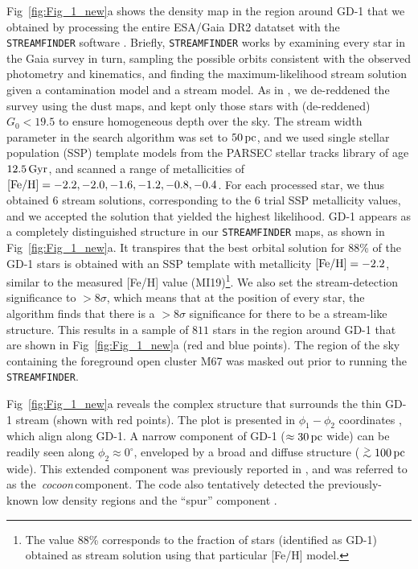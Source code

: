 \documentclass[apj]{emulateapj}
\def\gtsima{$\; \buildrel > \over \sim \;$}
\def\simgt{\lower.5ex\hbox{\gtsima}}
\def\pc{{\rm\,pc}}
\def\deg{^\circ}
\def\Gyr{{\rm\,Gyr}}
\def\gtsima{$\; \buildrel > \over \sim \;$}
\def\cocoon{{\it\,cocoon\,}}
\begin{document}
Fig~\ref{fig:Fig_1_new}a shows the density map in the region around GD-1 that we obtained by processing the entire ESA/Gaia DR2 datatset \citep{GaiaDR2_2018_Brown, GaiaDR2_2018_astrometry} with the \texttt{STREAMFINDER} software \citep{Malhan2018_SF, Malhan_Ghostly_2018, Ibata_Norse_streams2019}. Briefly, \texttt{STREAMFINDER} works by examining every star in the Gaia survey in turn, sampling the possible orbits consistent with the observed photometry and kinematics, and finding the maximum-likelihood stream solution given a contamination model and a stream model. As in \cite{Malhan_Ghostly_2018}, we de-reddened the survey using the \cite{Schlegel1998} dust maps, and kept only those stars with (de-reddened) $G_0<19.5$ to ensure homogeneous depth over the sky. The stream width parameter in the search algorithm was set to $50\pc$, and we used single stellar population (SSP) template models from the PARSEC stellar tracks library \citep{Parsec_isochrones2012} of age $12.5\Gyr$, and scanned a range of metallicities of ${\rm [Fe/H]}=-2.2, -2.0, -1.6, -1.2, -0.8, -0.4$. For each processed star, we thus obtained 6 stream solutions, corresponding to the 6 trial SSP metallicity values, and we accepted the solution that yielded the highest likelihood. GD-1 appears as a completely distinguished structure in our \texttt{STREAMFINDER} maps, as shown in Fig~\ref{fig:Fig_1_new}a. It transpires that the best orbital solution for 88\% of the GD-1 stars is obtained with an SSP template with metallicity ${\rm [Fe/H]}=-2.2$, similar to the measured [Fe/H] value (MI19)\footnote{The value 88\% corresponds to the fraction of stars (identified as GD-1) obtained as stream solution using that particular [Fe/H] model.}. We also set the stream-detection significance to $>8\sigma$, which means that at the position of every star, the algorithm finds that there is a $>8\sigma$ significance for there to be a stream-like structure. This results in a sample of $811$ stars in the region around GD-1 that are shown in Fig~\ref{fig:Fig_1_new}a (red and blue points). The region of the sky containing the foreground open cluster M67 was masked out prior to running the \texttt{STREAMFINDER}.

Fig~\ref{fig:Fig_1_new}a reveals the complex structure that surrounds the thin GD-1 stream (shown with red points). The plot is presented in $\phi_1 - \phi_2$ coordinates \citep{Koposov2010}, which align along GD-1. A narrow component of GD-1 ($\approx 30\pc$ wide) can be readily seen along $\phi_2 \approx 0\deg$, enveloped by a broad and diffuse structure ($\simgt 100\pc$ wide). This extended component was previously reported in \cite{MalhanCocoonDetection2019}, and was referred to as the \cocoon component. The code also tentatively detected the previously-known low density regions and the ``spur'' component \citep{WhelanBonacaGD12018}. 
\end{document}
